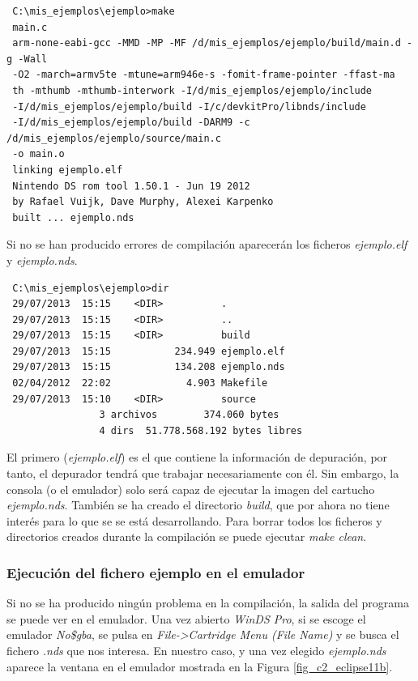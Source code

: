 {\scriptsize
\begin{verbatim}
 C:\mis_ejemplos\ejemplo>make
 main.c
 arm-none-eabi-gcc -MMD -MP -MF /d/mis_ejemplos/ejemplo/build/main.d -g -Wall 
 -O2 -march=armv5te -mtune=arm946e-s -fomit-frame-pointer -ffast-ma
 th -mthumb -mthumb-interwork -I/d/mis_ejemplos/ejemplo/include
 -I/d/mis_ejemplos/ejemplo/build -I/c/devkitPro/libnds/include 
 -I/d/mis_ejemplos/ejemplo/build -DARM9 -c /d/mis_ejemplos/ejemplo/source/main.c 
 -o main.o
 linking ejemplo.elf
 Nintendo DS rom tool 1.50.1 - Jun 19 2012
 by Rafael Vuijk, Dave Murphy, Alexei Karpenko
 built ... ejemplo.nds
\end{verbatim}
}

Si no se han producido errores de compilación aparecerán los ficheros  \textit{ejemplo.elf} y \textit{ejemplo.nds}.

{\scriptsize
 \begin{verbatim}
 C:\mis_ejemplos\ejemplo>dir
 29/07/2013  15:15    <DIR>          .
 29/07/2013  15:15    <DIR>          ..
 29/07/2013  15:15    <DIR>          build
 29/07/2013  15:15           234.949 ejemplo.elf
 29/07/2013  15:15           134.208 ejemplo.nds
 02/04/2012  22:02             4.903 Makefile
 29/07/2013  15:10    <DIR>          source
                3 archivos        374.060 bytes
                4 dirs  51.778.568.192 bytes libres
 \end{verbatim}
}

El primero (\textit{ejemplo.elf}) es el que contiene la información de depuración, por tanto, el depurador tendrá que trabajar necesariamente con él. Sin embargo,  la consola (o el emulador) solo será capaz de ejecutar la imagen del cartucho \textit{ejemplo.nds}. También se ha creado el directorio \textit{build}, que por ahora no tiene interés para lo que se  se está desarrollando. Para borrar todos los ficheros y directorios creados durante la compilación se puede ejecutar \textit{make clean}.

\subsubsection{Ejecución del fichero ejemplo en el emulador}
Si no se ha producido ningún problema en la compilación, la salida del programa se puede ver en el emulador. Una vez abierto \textit{WinDS Pro}, si se escoge el emulador \textit{No\$gba}, se pulsa en \textit{File->Cartridge Menu (File Name)} y se busca el fichero \textit{.nds} que nos interesa. En nuestro caso, y una vez elegido \textit{ejemplo.nds} aparece la ventana en el emulador mostrada en la Figura \ref{fig_c2_eclipse11b}.

